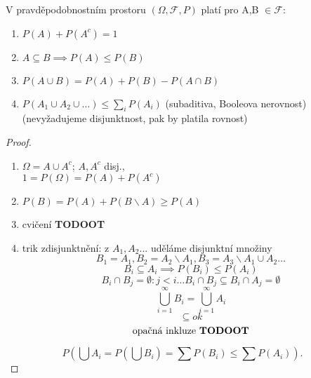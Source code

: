 \documentclass[../main.tex]{subfiles}
\begin{document}
\begin{theorem}
    V pravděpodobnostním prostoru $(\Omega, \mathcal{F}, P)$ platí pro A,B $\in \mathcal{F}$:
    \begin{enumerate}
        \item $P(A) + P(A^c) = 1$
        \item $A \subseteq B \implies P(A) \leq P(B)$
        \item $P(A\cup B) = P(A) + P(B) - P(A\cap B)$
        \item $P(A_1\cup A_2\cup \dots) \leq \sum_i P(A_i)$ (subaditiva, Booleova nerovnost)
         (nevyžadujeme disjunktnost, pak by platila rovnost)
    \end{enumerate}
\end{theorem}
\begin{proof}
    \begin{enumerate}
        \item $\Omega = A\cup A^c$; $A,A^c$ disj.,\\
        $1 = P(\Omega) = P(A) + P(A^c)$
        \item $P(B) = P(A) + P(B\backslash A) \geq P(A)$
        \item cvičení \textbf{TODOOT}
        \item trik zdisjunktnění: z $A_1,A_2...$ uděláme disjunktní množiny
         \[B_1 = A_1, B_2 = A_2 \backslash A_1, B_3 = A_3 \backslash A_1 \cup A_2 \dots\]
         \[B_i \subseteq A_i \implies P(B_i) \leq P(A_i)\]
         \[B_i \cap B_j = \emptyset : j < i \dots B_i \cap B_j \subseteq B_i \cap A_j = \emptyset\]
         \[\bigcup^\infty_{i=1}B_i = \bigcup^\infty_{i=1}A_i\]
         \[\subseteq ok\]
         \[\text{opačná inkluze \textbf{TODOOT}}\]
    \end{enumerate}
    \[P(\bigcup A_i = P(\bigcup B_i) = \sum P(B_i) \leq \sum P(A_i)).\]
\end{proof}
\end{document}
